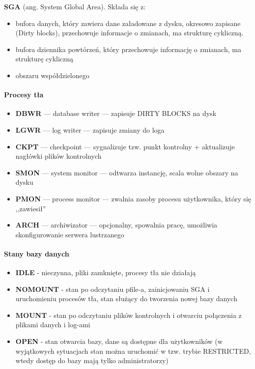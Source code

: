 \documentclass[a4paper,twoside]{report}
\begin{document}
\textbf{SGA} (ang. System Global Area). 
Składa się z:
\begin{itemize}
\item bufora danych, który zawiera dane załadowane z dysku, okresowo zapisane (Dirty blocks), przechowuje informacje o zmianach, ma strukturę cykliczną.
\item bufora dziennika powtórzeń, który przechowuje informację o zmianach, ma strukturę cykliczną
\item obszaru współdzielonego
\end{itemize}

\paragraph{Procesy tła}
\begin{itemize}
\item \textbf{DBWR} — database writer — zapisuje DIRTY BLOCKS na dysk 
\item \textbf{LGWR} — log writer — zapisuje zmiany do loga
\item \textbf{CKPT} — checkpoint — sygnalizuje tzw. punkt kontrolny + aktualizuje nagłówki plików kontrolnych
\item \textbf{SMON} — system monitor — odtwarza instancję, scala wolne obszary na dysku
\item \textbf{PMON} — process monitor — zwalnia zasoby procesu użytkownika, który się ,,zawiesił''
\item \textbf{ARCH} — archiwizator — opcjonalny, spowalnia pracę, umożliwia skonfigurowanie serwera lustrzanego
\end{itemize}

\paragraph{Stany bazy danych}

\begin{itemize}
\item \textbf{IDLE} - nieczynna, pliki zamknięte, procesy tła nie działają 
\item \textbf{NOMOUNT} - stan po odczytaniu pfile-a, zainicjowaniu SGA i uruchomieniu procesów tła, stan służący do tworzenia nowej bazy danych
\item \textbf{MOUNT} - stan po odczytaniu plików kontrolnych i otwarciu połączenia z plikami danych i log-ami
\item \textbf{OPEN} - stan otwarcia bazy, dane są dostępne dla użytkowników (w wyjątkowych sytuacjach stan można uruchomić w tzw. trybie RESTRICTED, wtedy dostęp do bazy mają tylko administratorzy)

\end{itemize}
\end{document}
